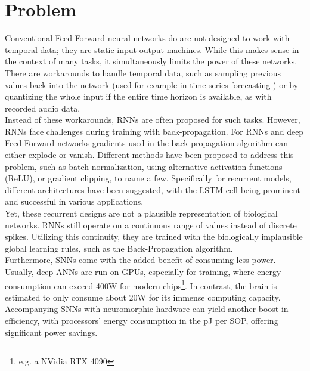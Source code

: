 \section{Problem}
Conventional Feed-Forward neural networks do are not designed to work with temporal data; they are static input-output machines. While this makes sense in the context of many tasks, it simultaneously limits the power of these networks. There are workarounds to handle temporal data, such as sampling previous values back into the network (used for example in time series forecasting \cite{tang_feedforward_1993,yang_cascade_2022,uncini_audio_2003}) or by quantizing the whole input if the entire time horizon is available, as with recorded audio data.\\
Instead of these workarounds, \acp{RNN} are often proposed for such tasks. However, \acp{RNN} face challenges during training with back-propagation\cite{bengio_learning_1994}. For \acp{RNN} and deep Feed-Forward networks gradients used in the back-propagation algorithm can either explode or vanish. Different methods have been proposed to address this problem, such as batch normalization\cite{ioffe_batch_2015}, using alternative activation functions (ReLU)\cite{nair_rectified_2010}, or gradient clipping\cite{pascanu_difficulty_2013}, to name a few. Specifically for recurrent models, different architectures have been suggested, with the \ac{LSTM} cell \cite{hochreiter_long_1997} being prominent and successful in various applications\cite{mayer_system_2006, sak_long_2014, li_constructing_2015}.\\
Yet, these recurrent designs are not a plausible representation of biological networks. \acp{RNN} still operate on a continuous range of values instead of discrete spikes. Utilizing this continuity, they are trained with the biologically implausible global learning rules, such as the Back-Propagation algorithm.\\
Furthermore, \acp{SNN} come with the added benefit of consuming less power. Usually, deep \acp{ANN} are run on \acp{GPU}, especially for training, where energy consumption can exceed 400W for modern chips\footnote{e.g. a NVidia RTX 4090}. In contrast, the brain is estimated to only consume about
20W \cite{clarke_circulation_1999} for its immense computing capacity. Accompanying \acp{SNN} with neuromorphic hardware can yield another boost in efficiency, with processors' energy consumption in the pJ per \ac{SOP}\cite{indiveri_importance_2019}, offering significant power savings.


